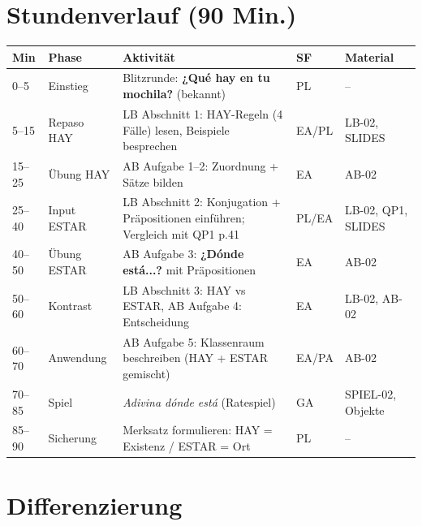 \documentclass[11pt,a4paper]{article}
\newcommand{\es}[1]{\textbf{#1}}
\begin{document}
\vspace{0.5cm}

\section*{Stundenverlauf (90 Min.)}

\begin{tabular}{|p{1cm}|p{2.2cm}|p{6.5cm}|p{1cm}|p{2.5cm}|}
\hline
\textbf{Min} & \textbf{Phase} & \textbf{Aktivität} & \textbf{SF} & \textbf{Material} \\
\hline
0--5 & Einstieg & Blitzrunde: \es{¿Qué hay en tu mochila?} (bekannt) & PL & -- \\
\hline
5--15 & Repaso HAY & LB Abschnitt 1: HAY-Regeln (4 Fälle) lesen, Beispiele besprechen & EA/PL & LB-02, SLIDES \\
\hline
15--25 & Übung HAY & AB Aufgabe 1--2: Zuordnung + Sätze bilden & EA & AB-02 \\
\hline
25--40 & Input ESTAR & LB Abschnitt 2: Konjugation + Präpositionen einführen; Vergleich mit QP1 p.41 & PL/EA & LB-02, QP1, SLIDES \\
\hline
40--50 & Übung ESTAR & AB Aufgabe 3: \es{¿Dónde está...?} mit Präpositionen & EA & AB-02 \\
\hline
50--60 & Kontrast & LB Abschnitt 3: HAY vs ESTAR, AB Aufgabe 4: Entscheidung & EA & LB-02, AB-02 \\
\hline
60--70 & Anwendung & AB Aufgabe 5: Klassenraum beschreiben (HAY + ESTAR gemischt) & EA/PA & AB-02 \\
\hline
70--85 & Spiel & \textit{Adivina dónde está} (Ratespiel) & GA & SPIEL-02, Objekte \\
\hline
85--90 & Sicherung & Merksatz formulieren: HAY = Existenz / ESTAR = Ort & PL & -- \\
\hline
\end{tabular}

\vspace{0.5cm}

\section*{Differenzierung}
\end{document}
